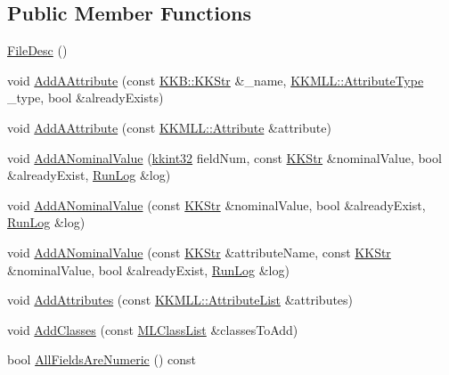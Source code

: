 \subsection*{Public Member Functions}
\begin{DoxyCompactItemize}
\item 
\hyperlink{class_k_k_m_l_l_1_1_file_desc_a410f61294a928a3c31d9d806504d7abf}{File\+Desc} ()
\item 
void \hyperlink{class_k_k_m_l_l_1_1_file_desc_ab920163b3e6155197bfc1bf2045555ca}{Add\+A\+Attribute} (const \hyperlink{class_k_k_b_1_1_k_k_str}{K\+K\+B\+::\+K\+K\+Str} \&\+\_\+name, \hyperlink{namespace_k_k_m_l_l_a99973706982b59debba670e2480555ab}{K\+K\+M\+L\+L\+::\+Attribute\+Type} \+\_\+type, bool \&already\+Exists)
\item 
void \hyperlink{class_k_k_m_l_l_1_1_file_desc_a53f6da49714df20680bbefff6499226e}{Add\+A\+Attribute} (const \hyperlink{class_k_k_m_l_l_1_1_attribute}{K\+K\+M\+L\+L\+::\+Attribute} \&attribute)
\item 
void \hyperlink{class_k_k_m_l_l_1_1_file_desc_a097d8903e7dd97fc4efa66b4293b6f4d}{Add\+A\+Nominal\+Value} (\hyperlink{namespace_k_k_b_a8fa4952cc84fda1de4bec1fbdd8d5b1b}{kkint32} field\+Num, const \hyperlink{class_k_k_b_1_1_k_k_str}{K\+K\+Str} \&nominal\+Value, bool \&already\+Exist, \hyperlink{class_k_k_b_1_1_run_log}{Run\+Log} \&log)
\item 
void \hyperlink{class_k_k_m_l_l_1_1_file_desc_a86a2a20b337e2645303baf7591952281}{Add\+A\+Nominal\+Value} (const \hyperlink{class_k_k_b_1_1_k_k_str}{K\+K\+Str} \&nominal\+Value, bool \&already\+Exist, \hyperlink{class_k_k_b_1_1_run_log}{Run\+Log} \&log)
\item 
void \hyperlink{class_k_k_m_l_l_1_1_file_desc_adbb90c1ecaf97ea35acdfa7fa3b4f3d4}{Add\+A\+Nominal\+Value} (const \hyperlink{class_k_k_b_1_1_k_k_str}{K\+K\+Str} \&attribute\+Name, const \hyperlink{class_k_k_b_1_1_k_k_str}{K\+K\+Str} \&nominal\+Value, bool \&already\+Exist, \hyperlink{class_k_k_b_1_1_run_log}{Run\+Log} \&log)
\item 
void \hyperlink{class_k_k_m_l_l_1_1_file_desc_a363b1895a649ca759b28dce3c8c3a58a}{Add\+Attributes} (const \hyperlink{class_k_k_m_l_l_1_1_attribute_list}{K\+K\+M\+L\+L\+::\+Attribute\+List} \&attributes)
\item 
void \hyperlink{class_k_k_m_l_l_1_1_file_desc_abeb0ede4c660ec82b0107924acfd9a45}{Add\+Classes} (const \hyperlink{class_k_k_m_l_l_1_1_m_l_class_list}{M\+L\+Class\+List} \&classes\+To\+Add)
\item 
bool \hyperlink{class_k_k_m_l_l_1_1_file_desc_a15d82452dc3bd8757f4666cea389022d}{All\+Fields\+Are\+Numeric} () const 

\end{DoxyCompactItemize}
